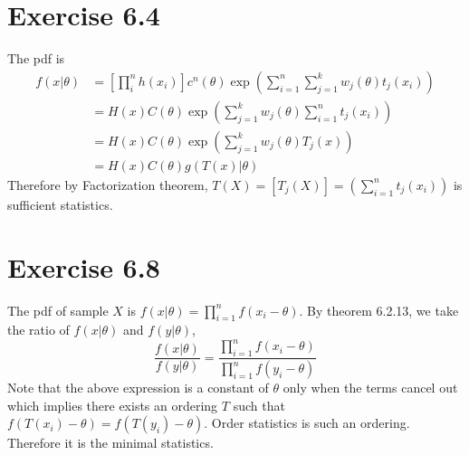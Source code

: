 \documentclass[12pt]{article}
\begin{document}
\section*{Exercise 6.4}
The pdf is $$
\begin{aligned}
	f(x|\theta) &= \left[\prod_i^n h(x_i) \right] c^n(\theta) \exp \left( \sum_{i=1}^{n} \sum_{j=1}^k w_j(\theta)t_j(x_i) \right) \\
	&= H(x)C(\theta) \exp \left(  \sum_{j=1}^k w_j(\theta)\sum_{i=1}^{n} t_j(x_i) \right) \\
	&= H(x)C(\theta) \exp \left(  \sum_{j=1}^k w_j(\theta)T_j(x) \right) \\
	&= H(x)C(\theta)g(T(x)|\theta)
\end{aligned}
$$
Therefore by Factorization theorem,  $T(X) = [T_j(X)] =  \left( \sum_{i=1}^{n} t_j(x_i) \right) $ is sufficient statistics.

\section*{Exercise 6.8}
The pdf of sample $X$ is $f(x|\theta) = \prod_{i=1}^n f(x_i - \theta)$. By theorem 6.2.13, we take the ratio of $f(x|\theta)$ and $f(y|\theta)$,  $$ \frac{f(x|\theta)}{f(y|\theta)} = \frac{\prod_{i=1}^n f(x_i - \theta)}{\prod_{i=1}^n f(y_i - \theta)}$$
Note that the above expression is a constant of $\theta$ only when the terms cancel out which implies there exists an ordering $T$ such that $f(T(x_i) - \theta) = f(T(y_i) - \theta)$. Order statistics is such an ordering. Therefore it is the minimal statistics.
\end{document}
